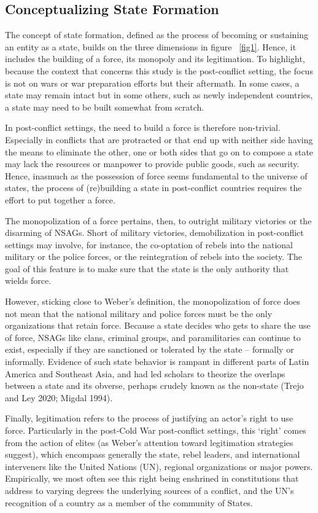 \documentclass [11pt]{article}
\begin{document}
\subsection*{Conceptualizing State Formation} %

The concept of state formation, defined as the process of becoming or sustaining an entity as a state, builds on the three dimensions in figure ~\ref{fig1}. Hence, it includes the building of a force, its monopoly and its legitimation. To highlight, because the context that concerns this study is the post-conflict setting, the focus is not on wars or war preparation efforts but their aftermath. In some cases, a state may remain intact but in some others, such as newly independent countries, a state may need to be built somewhat from scratch.

In post-conflict settings, the need to build a force is therefore non-trivial. Especially in conflicts that are protracted or that end up with neither side having the means to eliminate the other, one or both sides that go on to compose a state may lack the resources or manpower to provide public goods, such as security. Hence, inasmuch as the possession of force seems fundamental to the universe of states, the process of (re)building a state in post-conflict countries requires the effort to put together a force.

The monopolization of a force pertains, then, to outright military victories or the disarming of NSAGs. Short of military victories, demobilization in post-conflict settings may involve, for instance, the co-optation of rebels into the national military or the police forces, or the reintegration of rebels into the society. The goal of this feature is to make sure that the state is the only authority that wields force.

However, sticking close to Weber's definition, the monopolization of force does not mean that the national military and police forces must be the only organizations that retain force. Because a state decides who gets to share the use of force, NSAGs like clans, criminal groups, and paramilitaries can continue to exist, especially if they are sanctioned or tolerated by the state -- formally or informally. Evidence of such state behavior is rampant in different parts of Latin America and Southeast Asia, and had led scholars to theorize the overlaps between a state and its obverse, perhaps crudely known as the non-state (Trejo and Ley 2020; Migdal 1994).

Finally, legitimation refers to the process of justifying an actor's right to use force. Particularly in the post-Cold War post-conflict settings, this `right' comes from the action of elites (as Weber's attention toward legitimation strategies suggest), which encompass generally the state, rebel leaders, and international interveners like the United Nations (UN), regional organizations or major powers. Empirically, we most often see this right being enshrined in constitutions that address to varying degrees the underlying sources of a conflict, and the UN's recognition of a country as a member of the community of States.
\end{document}
